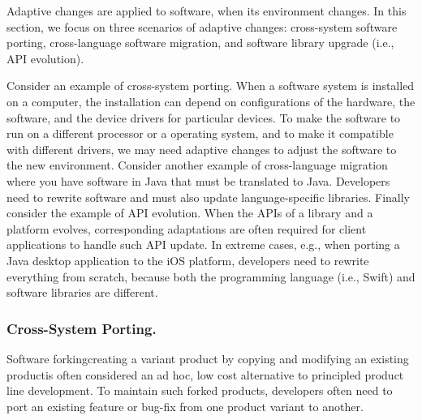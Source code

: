 Adaptive changes are applied to software, when its environment changes. In this section, we focus on three scenarios of adaptive changes: cross-system software porting, cross-language software migration, and software library upgrade (i.e., API evolution).

Consider an example of cross-system porting. When a software system is installed on a computer, the installation can depend on configurations of the hardware, the software, and the device drivers for particular devices. To make the software to run on a different processor or a operating system, and to make it compatible with different drivers, we may need adaptive changes to adjust the software to the new environment. 
Consider another example of cross-language migration where you have software in Java that must be translated to Java. Developers need to rewrite software and must also update language-specific libraries.
Finally consider the example of API evolution. When the APIs of a library and a platform evolves, corresponding adaptations are often required for client applications to handle such API update. In extreme cases, e.g., when porting a Java desktop application to the iOS platform, developers need to rewrite everything from scratch, because both the programming language (i.e., Swift) and software libraries are different. 

\subsubsection{Cross-System Porting.} 
Software forking\textemdash creating a variant product by copying and modifying an existing product\textemdash is often considered an ad hoc, low cost alternative to principled product line development. To maintain such forked products, developers often need to port an existing feature or bug-fix from one product variant to another. 

